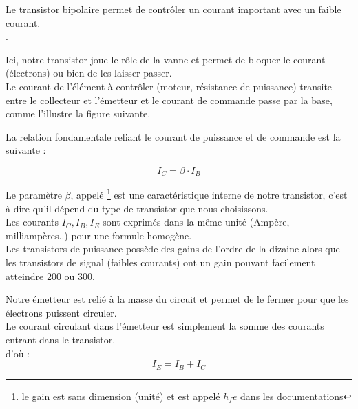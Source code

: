 Le transistor bipolaire permet de contrôler un courant important avec un faible courant.\\

.

Ici, notre transistor joue le rôle de la vanne et permet de bloquer le courant (électrons) ou bien de les laisser passer. \\


Le courant de l'élément à contrôler (moteur, résistance de puissance) transite entre le collecteur et l'émetteur et le courant de commande passe par la base, comme l'illustre la figure suivante.\\


La relation fondamentale reliant le courant de puissance et de commande est la suivante : 

$$ \boxed{ I_{C} = \beta \cdot I_{B} }$$

Le paramètre $\beta$, appelé \footnote{le gain est sans dimension (unité) et est appelé $ h_fe$ dans les documentations} est une caractéristique interne de notre transistor, c'est à dire qu'il dépend du type de transistor que nous choisissons.\\
Les courants $I_{C}, I_{B},I_{E}$ sont exprimés dans la même unité (Ampère, milliampères..) pour une formule homogène.\\

Les transistors de puissance possède des gains de l'ordre de la dizaine alors que les transistors de signal (faibles courants) ont un gain pouvant facilement atteindre 200 ou 300.



\begin{reponse}
  
  Notre émetteur est relié à la masse du circuit et permet de le fermer pour que les électrons puissent circuler.\\

  Le courant circulant dans l'émetteur est simplement la somme des courants entrant dans le transistor. \\
  d'où : $$ \boxed{ I_{E} = I_{B} + I_{C} }$$

  \end{reponse}



